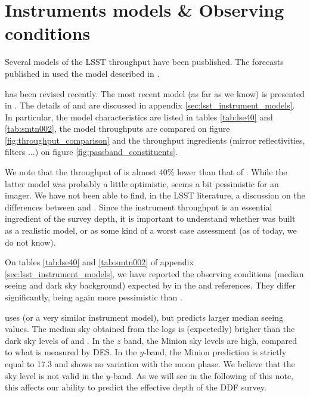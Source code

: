 \documentclass[\docopts]{\docclass}
\begin{document}
\section{Instruments models \& Observing conditions}
\label{sec:instrument_model_summary}

Several models of the LSST throughput have been pusblished.  The
forecasts published in \cite{2014A&A...572A..80A} used the model
described in \cite[][hereafter LSE-40]{LSE-40}. 

 has been revised recently. The most recent model (as far
as we know) is presented in \cite[][hereafter SMTN-002)]{SMTN-002}.
The details of  and  are discussed in
appendix \ref{sec:lsst_instrument_models}.  In particular, the model
characteristics are listed in tables \ref{tab:lse40} and
\ref{tab:smtn002}, the model throughputs are compared on figure
\ref{fig:throughput_comparison} and the throughput ingredients (mirror
reflectivities, filters ...) on figure \ref{fig:passband_constituents}.

We note that the throughput of  is almost 40\% lower
than that of .  While the latter model was probably a
little optimistic,  seems a bit pessimistic for an
imager.  We have not been able to find, in the LSST literature, a
discussion on the differences between  and
.  Since the instrument throughput is an essential
ingredient of the survey depth, it is important to understand whether
 was built as a realistic model, or as some kind of a
worst case assessment (as of today, we do not know).

On tables \ref{tab:lse40} and \ref{tab:smtn002} of appendix
\ref{sec:lsst_instrument_models}, we have reported the observing
conditions (median seeing and dark sky background) expected by in the
 and  references.  They differ
significantly,  being again more pessimistic than
.

 uses  (or a very similar instrument
model), but predicts larger median seeing values.  The median sky
obtained from the  logs is (expectedly) brigher
than the dark sky levels of  and . In the
$z$ band, the Minion sky levels are high, compared to what is measured
by DES.  In the $y$-band, the Minion prediction is strictly equal to
17.3 and shows no variation with the moon phase.  We believe that the
 sky level is not valid in the $y$-band. As we will
see in the following of this note, this affects our ability to predict
the effective depth of the DDF survey. 
\end{document}
